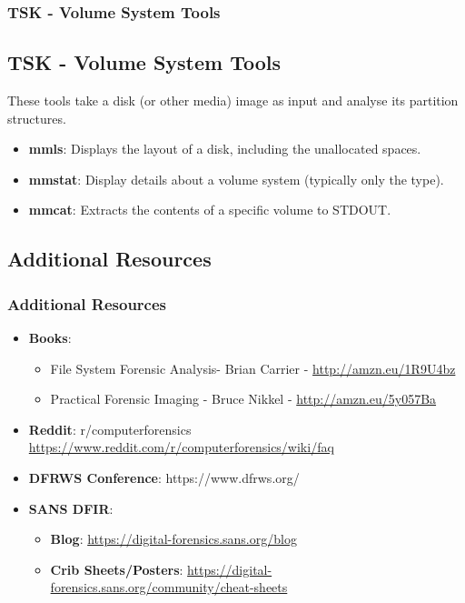 \documentclass{beamer}
\begin{document}
\begin{frame}
	\frametitle{TSK - Volume System Tools}
	\subsection*{TSK - Volume System Tools}
	These tools take a disk (or other media) image as input and analyse its partition structures. 
	\begin{itemize}
		\item \textbf{mmls}: Displays the layout of a disk, including the unallocated spaces.
		\item \textbf{mmstat}: Display details about a volume system (typically only the type).
		\item \textbf{mmcat}: Extracts the contents of a specific volume to STDOUT.
	\end{itemize}
\end{frame}

\begin{frame}
	\section{Additional Resources}
	\frametitle{Additional Resources}
	\begin{itemize}
	\item \textbf{Books}:
		\begin{itemize}
			\item File System Forensic Analysis- Brian Carrier - \url{http://amzn.eu/1R9U4bz}
			\item Practical Forensic Imaging - Bruce Nikkel - \url{http://amzn.eu/5y057Ba}
		\end{itemize}
	\item \textbf{Reddit}: r/computerforensics \url{https://www.reddit.com/r/computerforensics/wiki/faq}
	\item \textbf{DFRWS Conference}: https://www.dfrws.org/
	\item \textbf{SANS DFIR}:
		\begin{itemize}
			\item \textbf{Blog}: \url{https://digital-forensics.sans.org/blog}
			\item \textbf{Crib Sheets/Posters}: \url{https://digital-forensics.sans.org/community/cheat-sheets}
		\end{itemize}
	\end{itemize}
\end{frame}
\end{document}

